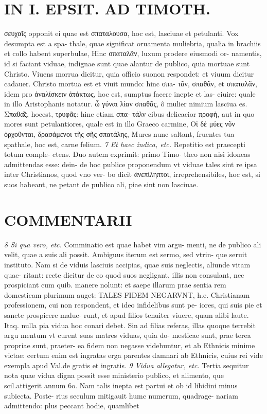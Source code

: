 \documentclass{article}
\begin{document}
\begin{pages}
\section*{IN I. EPSIT. AD TIMOTH. }\pstart σευχαῖς opponit ei quae est σπαταλουσα, hoc est, lasciuae et petulanti. Vox desumpta est a spa- thale, quae significat oruamenta muliebria, qualia in brachiis et collo habent superbulae, Hinc σπαταλᾶν, luxum prodere eiusmodi or- namentis, id si faciant viduae, indignae sunt quae alantur de publico, quia mortuae sunt Christo. Viuens morrua dicitur, quia officio suonon respondet: et viuum dicitur cadauer. Christo mortua est et viuit mundo: hinc σπa- τᾶν, σπαθᾶν, et σπαταλᾶν, idem pro ἀναλίσκειν ἀτάκτως, hoc est, sumptus facere inepte et las- ciuire: quale in illo Aristophanis notatur. ὦ γύναι λίαν σπαθᾶς, ô mulier nimium lasciua es. Σπαθα̃͂ς, hocest, τρυφᾶς: hinc etiam σπα- τάλν cibus delicacior προφὴ, aut in quo mores sunt petulantiores, quale est in illo Graeco carmine, Οἱ δὲ μύες νῦν ὀρχοῦνται, δρασάμενοι τῆς σῆς σπατάλης, Mures nunc saltant, fruentes tua spathale, hoc est, carne felium.  \pend
\textit{7 Et haec indica, etc. }\pstart Repetitio est praecepti totum comple- ctens. Duo autem exprimit: primo Timo- theo non nisi idoneas admittendas esse: dein- de hoc publice proponendum vt viduae tales sint re ipsa inter Christianos, quod vno ver- bo dicit ἀνεπίληπτοι, irreprehensibiles, hoc est, si suos habeant, ne petant de publico ali, piae sint non lasciuae.  \pend
\marginpar{[ p.125 ]}
\marginpar{[ p.126 ]}
\section*{COMMENTARII }
\textit{8 Si qua vero, etc. }\pstart Comminatio est quae habet vim argu- menti, ne de publico ali velit, quae a suis ali possit. Ambiguus iterum est sermo, sed vtrin- que seruit instituto. Nam si de viduis lasciuis accipias, quae suis neglectis, aliunde vitam quae- ritant: recte dicitur de eo quod suos negligant, illis non consulant, nec prospiciant cum quib. manere nolunt: et saepe illarum prae sentia rem domesticam plurimum auget: TALES FIDEM NEGARVNT, h.e. Christianam professionem, cui non respondent, et ideo infidelibus sunt pe- iores, qui suis pie et sancte prospicere malue- runt, et apud filios tenuiter viuere, quam alibi laute. Itaq. nulla pia vidua hoc conari debet. Sin ad filias referas, illas quoque terrebit argu mentum vt curent suas matres viduas, quia do- mesticae sunt, prae terea propriae sunt, praeter- ea fidem non negasse videbuntur, et ab Ethnicis minime victae: certum enim est ingratas erga parentes damnari ab Ethnicis, cuius rei vide exempla apud Val.de gratis et ingratis.  \pend
\textit{9 Vidua allegatur, etc. }\pstart Tertia sequitur nota quae vidua digna possit esse ministerio publico, et alimento, que scil.attigerit annum 6o. Nam talis inepta est partui et ob id libidini minus subiecta. Poste- rius seculum mitigauit humc numerum, quadrage- nariam admittendo: plus peccant hodie, quamlibet  \pend

\end{pages}
\end{document}
